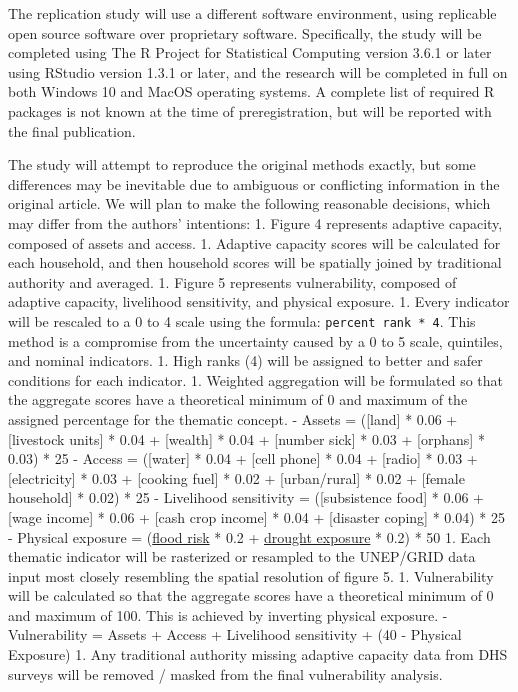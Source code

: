\documentclass[
]{article}
\begin{document}
The replication study will use a different software environment, using
replicable open source software over proprietary software. Specifically,
the study will be completed using The R Project for Statistical
Computing version 3.6.1 or later using RStudio version 1.3.1 or later,
and the research will be completed in full on both Windows 10 and MacOS
operating systems. A complete list of required R packages is not known
at the time of preregistration, but will be reported with the final
publication.

The study will attempt to reproduce the original methods exactly, but
some differences may be inevitable due to ambiguous or conflicting
information in the original article. We will plan to make the following
reasonable decisions, which may differ from the authors' intentions: 1.
Figure 4 represents adaptive capacity, composed of assets and access. 1.
Adaptive capacity scores will be calculated for each household, and then
household scores will be spatially joined by traditional authority and
averaged. 1. Figure 5 represents vulnerability, composed of adaptive
capacity, livelihood sensitivity, and physical exposure. 1. Every
indicator will be rescaled to a 0 to 4 scale using the formula:
\texttt{percent\ rank\ *\ 4}. This method is a compromise from the
uncertainty caused by a 0 to 5 scale, quintiles, and nominal indicators.
1. High ranks (4) will be assigned to better and safer conditions for
each indicator. 1. Weighted aggregation will be formulated so that the
aggregate scores have a theoretical minimum of 0 and maximum of the
assigned percentage for the thematic concept. - Assets = ({[}land{]} *
0.06 + {[}livestock units{]} * 0.04 + {[}wealth{]} * 0.04 + {[}number
sick{]} * 0.03 + {[}orphans{]} * 0.03) * 25 - Access = ({[}water{]} *
0.04 + {[}cell phone{]} * 0.04 + {[}radio{]} * 0.03 + {[}electricity{]}
* 0.03 + {[}cooking fuel{]} * 0.02 + {[}urban/rural{]} * 0.02 +
{[}female household{]} * 0.02) * 25 - Livelihood sensitivity =
({[}subsistence food{]} * 0.06 + {[}wage income{]} * 0.06 + {[}cash crop
income{]} * 0.04 + {[}disaster coping{]} * 0.04) * 25 - Physical
exposure = (\protect\hyperlink{flood-risk}{flood risk} * 0.2 +
\protect\hyperlink{drought-exposure}{drought exposure} * 0.2) * 50 1.
Each thematic indicator will be rasterized or resampled to the UNEP/GRID
data input most closely resembling the spatial resolution of figure 5.
1. Vulnerability will be calculated so that the aggregate scores have a
theoretical minimum of 0 and maximum of 100. This is achieved by
inverting physical exposure. - Vulnerability = Assets + Access +
Livelihood sensitivity + (40 - Physical Exposure) 1. Any traditional
authority missing adaptive capacity data from DHS surveys will be
removed / masked from the final vulnerability analysis.
\end{document}

